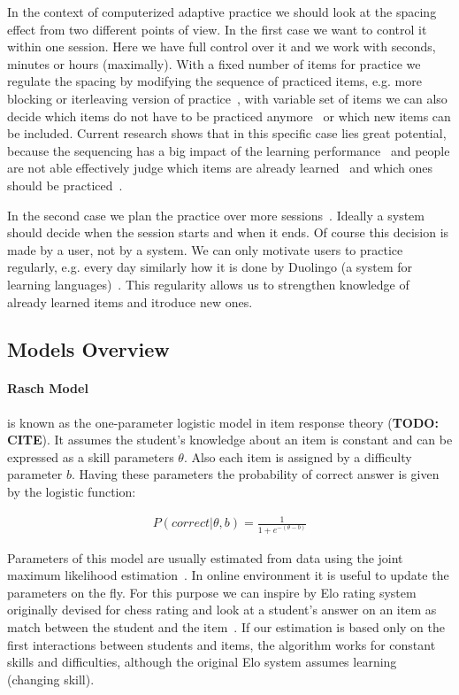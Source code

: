 \documentclass[table,color]{fithesis3/fithesis3}
\begin{document}
In the context of computerized adaptive practice we should look at the spacing
effect from two different points of view. In the first case we want to control
it within one session. Here we have full control over it and we work with
seconds, minutes or hours (maximally). With a fixed number of items for
practice we regulate the spacing by modifying the sequence of practiced items,
e.g. more blocking or iterleaving version of
practice~\cite{ostrow2015blocking}, with variable set of items we can also
decide which items do not have to be practiced
anymore~\cite{kornell2008optimising} or which new items can be included.
Current research shows that in this specific case lies great potential, because
the sequencing has a big impact of the learning
performance~\cite{ostrow2015blocking} and people are not able effectively judge
which items are already learned~\cite{kornell2008optimising} and which ones
should be practiced~\cite{kornell2014focusing}.

In the second case we plan the practice over more
sessions~\cite{kang2014retrieval}. Ideally a system should decide when the
session starts and when it ends. Of course this decision is made by a user,
not by a system. We can only motivate users to practice regularly, e.g. every
day similarly how it is done by Duolingo (a system for learning
languages)~\cite{garcia2013learning}. This regularity allows us to strengthen
knowledge of already learned items and itroduce new ones.

\subsection{Models Overview}

\paragraph{Rasch Model} is known as the one-parameter logistic model in item
response theory (\textbf{TODO: CITE}). It assumes the student's knowledge about
an item is constant and can be expressed as a skill parameters $\theta$. Also
each item is assigned by a difficulty parameter $b$. Having these parameters
the probability of correct answer is given by the logistic function:

\begin{align}
P(correct|\theta,b) = \frac{1}{1 + e^{-(\theta - b)}}
\end{align}

Parameters of this model are usually estimated from data using the joint
maximum likelihood estimation~\cite{de2008theory}. In online environment it is
useful to update the parameters on the fly. For this purpose we can inspire by
Elo rating system~\cite{elo1978rating} originally devised for chess rating and
look at a student's answer on an item as match between the student and
the item~\cite{papousek2014adaptive}. If our estimation is based only on the
first interactions between students and items, the algorithm works for constant
skills and difficulties, although the original Elo system assumes learning (changing skill).
\end{document}

